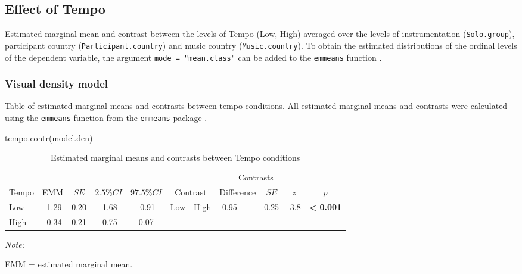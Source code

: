 \documentclass[
  bookmarksnumbered]{article}
\newenvironment{Shaded}{\begin{snugshade}}{\end{snugshade}}
\newcommand{\FunctionTok}[1]{\textcolor[rgb]{0.94,0.94,0.56}{#1}}
\newcommand{\NormalTok}[1]{\textcolor[rgb]{0.80,0.80,0.80}{#1}}
\begin{document}
\hypertarget{effect-of-tempo}{%
\subsection{Effect of Tempo}\label{effect-of-tempo}}

Estimated marginal mean and contrast between the levels of Tempo (Low, High) averaged over the levels of instrumentation (\texttt{Solo.group}), participant country (\texttt{Participant.country}) and music country (\texttt{Music.country}). To obtain the estimated distributions of the ordinal levels of the dependent variable, the argument \texttt{mode\ =\ "mean.class"} can be added to the \texttt{emmeans} function \autocite[see][]{532079}.

\hypertarget{visual-density-model}{%
\subsubsection{Visual density model}\label{visual-density-model}}

Table of estimated marginal means and contrasts between tempo conditions. All estimated marginal means and contrasts were calculated using the \texttt{emmeans} function from the \texttt{emmeans} package \autocite{emmeanscit}.

\begin{Shaded}
\begin{Highlighting}[]
\FunctionTok{tempo.contr}\NormalTok{(model.den)}
\end{Highlighting}
\end{Shaded}

\begin{table}[H]

\caption{\label{tab:tab-den-emms}Estimated marginal means and contrasts between Tempo conditions}
\centering
\begin{threeparttable}
\begin{tabular}[t]{lccccclccc}
\toprule
\multicolumn{5}{c}{ } & \multicolumn{5}{c}{Contrasts} \\
\cmidrule(l{3pt}r{3pt}){6-10}
Tempo & EMM & $SE$ & $2.5\% CI$ & $97.5\% CI$ & Contrast & Difference & $SE$ & $z$ & $p$\\
\midrule
Low & -1.29 & 0.20 & -1.68 & -0.91 & Low - High & -0.95 & 0.25 & -3.8 & \textbf{< 0.001}\\
High & -0.34 & 0.21 & -0.75 & 0.07 &  &  &  &  & \\
\bottomrule
\end{tabular}
\begin{tablenotes}[para]
\item \textit{Note: } 
\item EMM = estimated marginal mean.
\end{tablenotes}
\end{threeparttable}
\end{table}
\end{document}

